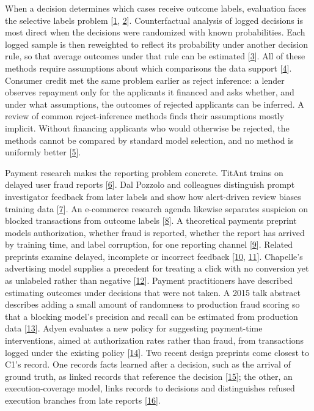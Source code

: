 \documentclass[
  11pt,
]{article}
\begin{document}
When a decision determines which cases receive outcome labels,
evaluation faces the selective labels problem
{[}\protect\hyperlink{ref-Lakkaraju2017Selective}{1},
\protect\hyperlink{ref-Kilbertus2020Fair}{2}{]}. Counterfactual analysis
of logged decisions is most direct when the decisions were randomized
with known probabilities. Each logged sample is then reweighted to
reflect its probability under another decision rule, so that average
outcomes under that rule can be estimated
{[}\protect\hyperlink{ref-Bottou2013Counterfactual}{3}{]}. All of these
methods require assumptions about which comparisons the data support
{[}\protect\hyperlink{ref-HernanRobins2020}{4}{]}. Consumer credit met
the same problem earlier as reject inference: a lender observes
repayment only for the applicants it financed and asks whether, and
under what assumptions, the outcomes of rejected applicants can be
inferred. A review of common reject-inference methods finds their
assumptions mostly implicit. Without financing applicants who would
otherwise be rejected, the methods cannot be compared by standard model
selection, and no method is uniformly better
{[}\protect\hyperlink{ref-Ehrhardt2021RejectInference}{5}{]}.

Payment research makes the reporting problem concrete. TitAnt trains on
delayed user fraud reports
{[}\protect\hyperlink{ref-Cao2019TitAnt}{6}{]}. Dal Pozzolo and
colleagues distinguish prompt investigator feedback from later labels
and show how alert-driven review biases training data
{[}\protect\hyperlink{ref-DalPozzolo2017Fraud}{7}{]}. An e-commerce
research agenda likewise separates suspicion on blocked transactions
from outcome labels {[}\protect\hyperlink{ref-Tax2021Fraud}{8}{]}. A
theoretical payments preprint models authorization, whether fraud is
reported, whether the report has arrived by training time, and label
corruption, for one reporting channel
{[}\protect\hyperlink{ref-Dhama2026Causal}{9}{]}. Related preprints
examine delayed, incomplete or incorrect feedback
{[}\protect\hyperlink{ref-Dhama2026Limits}{10},
\protect\hyperlink{ref-HeLoh2026Grab}{11}{]}. Chapelle's advertising
model supplies a precedent for treating a click with no conversion yet
as unlabeled rather than negative
{[}\protect\hyperlink{ref-Chapelle2014Delayed}{12}{]}. Payment
practitioners have described estimating outcomes under decisions that
were not taken. A 2015 talk abstract describes adding a small amount of
randomness to production fraud scoring so that a blocking model's
precision and recall can be estimated from production data
{[}\protect\hyperlink{ref-Manapat2015Counterfactual}{13}{]}. Adyen
evaluates a new policy for suggesting payment-time interventions, aimed
at authorization rates rather than fraud, from transactions logged under
the existing policy {[}\protect\hyperlink{ref-Egg2025AdyenOPE}{14}{]}.
Two recent design preprints come closest to C1's record. One records
facts learned after a decision, such as the arrival of ground truth, as
linked records that reference the decision
{[}\protect\hyperlink{ref-Solozobov2026DecisionTrace}{15}{]}; the other,
an execution-coverage model, links records to decisions and
distinguishes refused execution branches from late reports
{[}\protect\hyperlink{ref-Wu2026EvidenceCoverage}{16}{]}.
\end{document}
